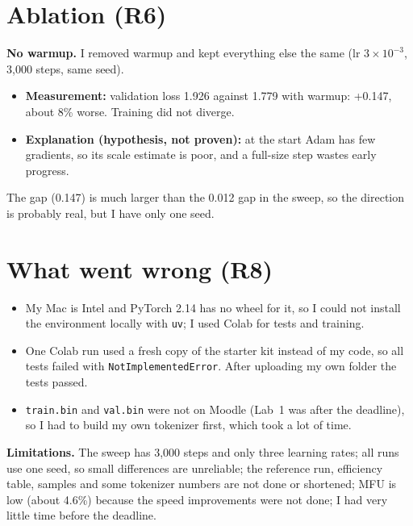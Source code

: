 \documentclass[11pt,a4paper]{article}
\begin{document}
\section{Ablation (R6)}
\textbf{No warmup.} I removed warmup and kept everything else the same (lr $3\times10^{-3}$, 3,000 steps, same seed).
\begin{itemize}\itemsep0pt
\item \textbf{Measurement:} validation loss 1.926 against 1.779 with warmup: +0.147, about 8\% worse. Training did not diverge.
\item \textbf{Explanation (hypothesis, not proven):} at the start Adam has few gradients, so its scale estimate is poor, and a full-size step wastes early progress.
\end{itemize}
The gap (0.147) is much larger than the 0.012 gap in the sweep, so the direction is probably real, but I have only one seed.

\section{What went wrong (R8)}
\begin{itemize}\itemsep0pt
\item My Mac is Intel and PyTorch 2.14 has no wheel for it, so I could not install the environment locally with \texttt{uv}; I used Colab for tests and training.
\item One Colab run used a fresh copy of the starter kit instead of my code, so all tests failed with \texttt{NotImplementedError}. After uploading my own folder the tests passed.
\item \texttt{train.bin} and \texttt{val.bin} were not on Moodle (Lab~1 was after the deadline), so I had to build my own tokenizer first, which took a lot of time.

\end{itemize}
\textbf{Limitations.} The sweep has 3,000 steps and only three learning rates; all runs use one seed, so small differences are unreliable; the reference run, efficiency table, samples and some tokenizer numbers are not done or shortened; MFU is low (about 4.6\%) because the speed improvements were not done; I had very little time before the deadline.

\appendix
\end{document}
